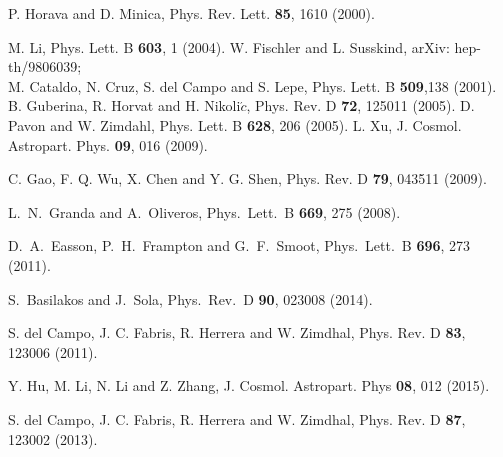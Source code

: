 \documentclass[11pt]{article}
\begin{document}
\begin{thebibliography}{}
P. Horava and D. Minica, Phys. Rev. Lett. {\bf 85}, 1610 (2000).


M. Li, Phys. Lett. B {\bf 603}, 1 (2004).
W. Fischler and L. Susskind, arXiv: hep-th/9806039;\\
                  M. Cataldo, N. Cruz, S. del Campo and S. Lepe, Phys. Lett. B {\bf 509},138 (2001).
B. Guberina, R. Horvat and H. Nikoli$\acute{c}$, Phys. Rev. D {\bf 72}, 125011 (2005).
D. Pavon and W. Zimdahl, Phys. Lett. B {\bf 628}, 206 (2005).
     L. Xu,  J. Cosmol. Astropart. Phys. {\bf 09}, 016 (2009).

C. Gao, F. Q. Wu, X. Chen and Y. G. Shen, Phys. Rev. D {\bf 79}, 043511 (2009).


  L.~N.~Granda and A.~Oliveros,
  Phys.\ Lett.\ B {\bf 669}, 275 (2008).




  D.~A.~Easson, P.~H.~Frampton and G.~F.~Smoot,
  Phys.\ Lett.\ B {\bf 696}, 273 (2011).



  S.~Basilakos and J.~Sola,
  Phys.\ Rev.\ D {\bf 90}, 023008 (2014).





S. del Campo, J. C. Fabris, R. Herrera and W. Zimdhal, Phys. Rev. D {\bf 83}, 123006 (2011).



Y. Hu, M. Li, N. Li and Z. Zhang, J. Cosmol. Astropart. Phys {\bf 08}, 012 (2015).


S. del Campo, J. C. Fabris, R. Herrera and W. Zimdhal, Phys. Rev. D {\bf 87}, 123002 (2013).


\end{thebibliography}
\end{document}
